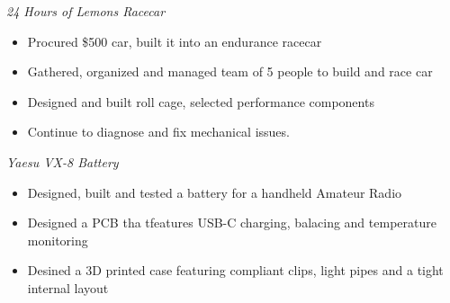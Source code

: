 \documentclass[line,mmmargin]{res}
\begin{document}
\begin{resume}
	{\sl 24 Hours of Lemons Racecar}
		\begin{itemize} \itemsep -2pt
			\item Procured \$500 car, built it into an endurance racecar
			\item Gathered, organized and managed team of 5 people to build and race car
			\item Designed and built roll cage, selected performance components
			\item Continue to diagnose and fix mechanical issues. 
		\end{itemize}
	\vspace{-10pt}
	{\sl Yaesu VX-8 Battery}
		\begin{itemize} \itemsep -2pt
			\item Designed, built and tested a battery for a
				handheld Amateur Radio
			\item Designed a PCB tha tfeatures USB-C charging,
				balacing  and temperature monitoring
			\item Desined a 3D printed case featuring compliant
				clips, light pipes and a tight internal layout
		\end{itemize}
	\vspace{-10pt}


\end{resume}
\end{document}
